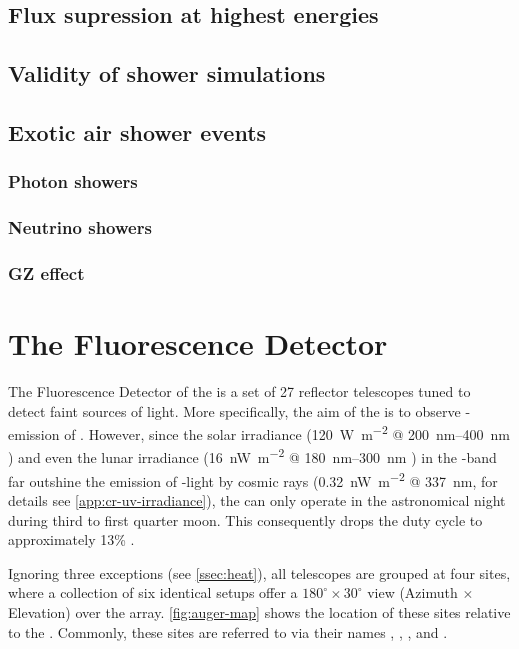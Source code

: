 \subsection{Flux supression at highest energies}
\label{ssec:flux-supression}

\subsection{Validity of shower simulations}


\subsection{Exotic air shower events}
\subsubsection{Photon showers}
\subsubsection{Neutrino showers}
\subsubsection{GZ effect}

\section{The Fluorescence Detector}
\label{sec:fd}

The Fluorescence Detector of the \PAO is a set of 27 reflector telescopes tuned
to detect faint sources of \UV light. More specifically, the aim of the \FD is
to observe \UV-emission of \EAS. However, since the solar irradiance 
(\SI{120}{\watt\per\meter\squared} @
\SIrange[range-phrase={--}]{200}{400}{\nano\meter} \cite{Snow2013}) and even the
lunar irradiance (\SI{16}{\nano\watt\per\meter\squared} @
\SIrange[range-phrase={--}]{180}{300}{\nano\meter} \cite{Lean1989}) in the 
\UV-band far outshine the emission of \UV-light by cosmic rays 
(\SI{0.32}{\nano\watt\per\meter\squared} @ \SI{337}{\nano\meter}, for details 
see \cref{app:cr-uv-irradiance}), the \FD can only operate in the astronomical 
night during third to first quarter moon. This consequently drops the duty cycle 
to approximately 13\% \cite{Abraham2010}.

Ignoring three exceptions (see \autoref{ssec:heat}), all telescopes are grouped
at four \FD sites, where a collection of six identical setups offer a $180^\circ
\times30^\circ$ view (Azimuth $\times$ Elevation) over the \SD array. 
\autoref{fig:auger-map} shows the location of these sites relative to the \SD.
Commonly, these sites are referred to via their names \CO, \LA, \LM, and \LL.

